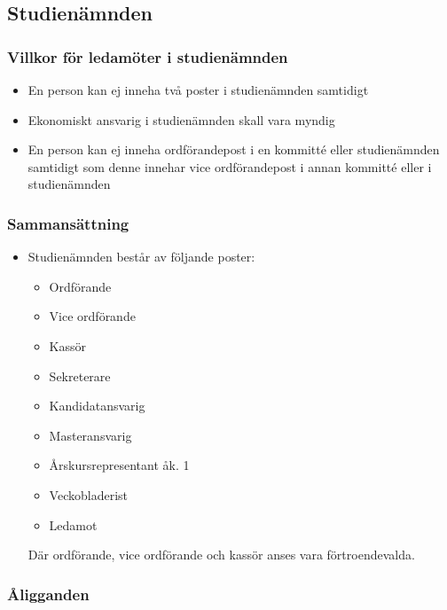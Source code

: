 \documentclass[11pt,a4paper]{article}
\begin{document}
\subsection{Studienämnden}

\subsubsection{Villkor för ledamöter i studienämnden}
\begin{itemize}
\item En person kan ej inneha två poster i studienämnden samtidigt
\item Ekonomiskt ansvarig i studienämnden skall vara myndig
\item En person kan ej inneha ordförandepost i en kommitté eller studienämnden samtidigt som denne innehar vice ordförandepost i annan kommitté eller i studienämnden
\end{itemize}

\subsubsection{Sammansättning}

\begin{itemize}

  \item Studienämnden består av följande poster:
    \begin{itemize}

      \item Ordförande
      \item Vice ordförande
      \item Kassör
      \item Sekreterare
      \item Kandidatansvarig
      \item Masteransvarig
      \item Årskursrepresentant åk. 1
      \item Veckobladerist
      \item Ledamot

    \end{itemize}
Där ordförande, vice ordförande och kassör anses vara förtroendevalda.

\end{itemize}

\subsubsection{Åligganden}
\end{document}
